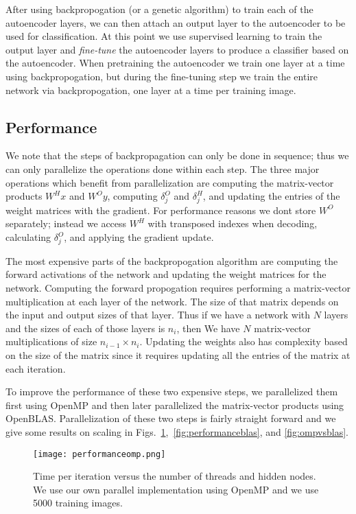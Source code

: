 After using backpropogation (or a genetic algorithm) to train each of the autoencoder layers, we can then attach an output layer to the autoencoder to be used for classification. At this
point we use supervised learning to train the output layer and \textit{fine-tune} the autoencoder layers to produce a classifier based on the autoencoder. When pretraining the autoencoder
we train one layer at a time using backpropogation, but during the fine-tuning step we train the entire network via backpropogation, one layer at a time per training image. 


\subsection{Performance}
We note that the steps of backpropagation can only be done in sequence; thus we can only parallelize the operations done within each step. The three major operations which benefit from parallelization are computing the matrix-vector products $W^{H}x$ and $W^{O}y$, computing $\delta^O_j$ and $\delta^H_j$, and updating the entries of the weight matrices with the gradient. For performance reasons we dont store $W^O$ separately; instead we access $W^H$ with transposed indexes when decoding, calculating $\delta^O_j$, and applying the gradient update.

The most expensive parts of the backpropogation algorithm are computing the forward activations of the network and updating the weight matrices for the network. Computing the forward propogation requires performing a matrix-vector multiplication at each layer of the network. The size of that matrix depends on the input and output sizes of that layer. Thus if we have a network with $N$ layers and the sizes of each of those layers is $n_i$, then We have $N$ matrix-vector multiplications of size $n_{i-1} \times n_i$. Updating the weights also has complexity based on the size of the matrix since it requires updating all the entries of the matrix at each iteration.

To improve the performance of these two expensive steps, we parallelized them first using OpenMP and then later parallelized the matrix-vector products using OpenBLAS. Parallelization of these two steps is fairly straight forward and we give some results on scaling in Figs.~\ref{fig:performanceomp},~\ref{fig:performanceblas}, and \ref{fig:ompvsblas}.


\begin{figure}[h]
\centering
\texttt{[image: performanceomp.png]}
\caption{Time per iteration versus the number of threads and hidden nodes. We use our own parallel implementation using OpenMP and we use 5000 training images.}
\label{fig:performanceomp}
\end{figure}


